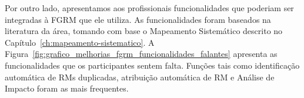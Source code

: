 
Por outro lado, apresentamos aos profissionais funcionalidades que poderiam ser
integradas à FGRM que ele utiliza. As funcionalidades foram baseados na
literatura da área, tomando com base o Mapeamento Sistemático descrito no
Capítulo~\ref{ch:mapeamento-sistematico}. A
Figura~\ref{fig:grafico_melhorias_fgrm_funcionalidades_falantes} apresenta as
funcionalidades que os participantes sentem falta. Funções tais como
identificação automática de RMs duplicadas, atribuição automática de RM e
Análise de Impacto foram as mais frequentes.

